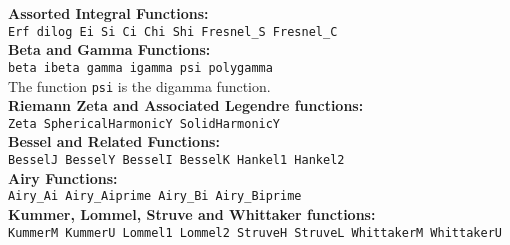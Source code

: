 \hypertarget{operator:psi}{}
\hypertarget{operator:Zeta}{}
\hypertarget{operator:SphericalHarmonicY}{}
\hypertarget{operator:SolidHarmonicY}{}
\hypertarget{operator:BesselI}{}
\hypertarget{operator:BesselJ}{}
\hypertarget{operator:BesselK}{}
\hypertarget{operator:BesselY}{}
\hypertarget{operator:Hankel1}{}
\hypertarget{operator:Hankel2}{}
\hypertarget{operator:AIRY_AI}{}
\hypertarget{operator:AIRY_AIPRIME}{}
\hypertarget{operator:AIRY_BI}{}
\hypertarget{operator:AIRY_BIPRIME}{}
\hypertarget{operator:KummerM}{}
\hypertarget{operator:KummerU}{}
\hypertarget{operator:Lommel1}{}
\hypertarget{operator:Lommel2}{}
\hypertarget{operator:StruveH}{}
\hypertarget{operator:StruveL}{}
\hypertarget{operator:WhittakerM}{}
\hypertarget{operator:WhittakerU}{}
\textbf{Assorted Integral Functions:}\\
\texttt{Erf dilog Ei Si Ci Chi Shi Fresnel\_S Fresnel\_C }\\
\textbf{Beta and Gamma Functions:}\\
\texttt{beta ibeta gamma igamma psi polygamma}\\
The function \texttt{psi} is the digamma function.\\
\textbf{Riemann Zeta and Associated Legendre functions:}\\
\texttt{Zeta SphericalHarmonicY SolidHarmonicY}\\
\textbf{Bessel and Related Functions:}\\
\texttt{BesselJ BesselY BesselI BesselK Hankel1 Hankel2}\\
\textbf{Airy Functions:}\\
\texttt{Airy\_Ai Airy\_Aiprime Airy\_Bi Airy\_Biprime}\\
\textbf{Kummer, Lommel, Struve and Whittaker functions:}\\
\texttt{KummerM KummerU Lommel1 Lommel2 StruveH StruveL WhittakerM WhittakerU}\\

